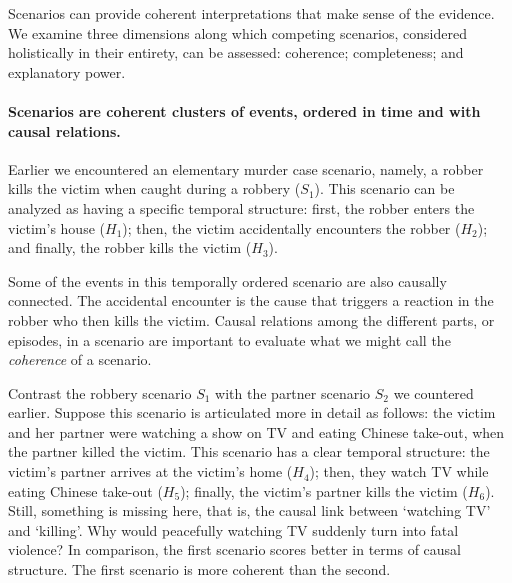 \documentclass[10pt]{article}
\begin{document}

Scenarios can provide coherent interpretations that make sense of the evidence.
We examine three dimensions along which competing scenarios, considered holistically in their entirety, 
can be assessed: coherence; completeness; and explanatory power.  

 
\paragraph{Scenarios are coherent clusters 
of events, ordered in time and with causal relations.} 
Earlier we encountered an elementary murder case scenario, namely, 
a robber kills the victim when caught during a robbery ($S_1$). This scenario 
can be analyzed as having a specific 
temporal structure:
first, the robber enters the victim's house ($H_1$); then, the victim accidentally encounters the robber ($H_2$); and finally, 
the robber kills the victim ($H_3$). 

Some of the events in this temporally 
ordered scenario are also causally connected. %
The accidental encounter is the cause that triggers a reaction 
in the robber who then kills the victim. 
Causal relations among the different parts, or episodes, 
in a scenario are important to evaluate what we might 
call the \textit{coherence} of a scenario. 

Contrast the robbery scenario $S_1$
with the partner scenario $S_2$ we countered earlier.
Suppose this scenario is articulated more in detail as follows: 
the victim and her partner were watching a show on TV and eating Chinese take-out, 
when the partner killed the victim. 
This scenario has a clear temporal structure: the victim's partner arrives at the victim's home ($H_4$); then, 
they watch TV while eating Chinese take-out ($H_5$); finally, the victim's partner kills the victim ($H_6$). 
Still, something is missing here, that is, the causal link between `watching TV' and `killing'. Why would peacefully 
watching TV suddenly turn into fatal violence?
In comparison, the first scenario scores better in terms 
of causal structure. The first scenario 
is more coherent than the second. 
\end{document}
